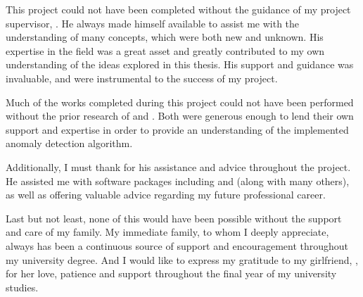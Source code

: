 This project could not have been completed without the guidance of my project
supervisor, \supervisorName{}. He always made himself available to assist me
with the understanding of many concepts, which were both new and unknown. His
expertise in the field was a great asset and greatly contributed to my own
understanding of the ideas explored in this thesis. His support and guidance was
invaluable, and were instrumental to the success of my project.

Much of the works completed during this project could not have been performed
without the prior research of  and . Both were
generous enough to lend their own support and expertise in order to provide an
understanding of the implemented anomaly detection algorithm.

Additionally, I must thank  for his assistance and advice
throughout the project. He assisted me with software packages including
 and
 (along with many
others), as well as offering valuable advice regarding my future professional
career.

Last but not least, none of this would have been possible without the support
and care of my family. My immediate family, to whom I deeply appreciate, always
has been a continuous source of support and encouragement throughout my
university degree. And I would like to express my gratitude to my girlfriend,
, for her love, patience and support throughout the final
year of my university studies.